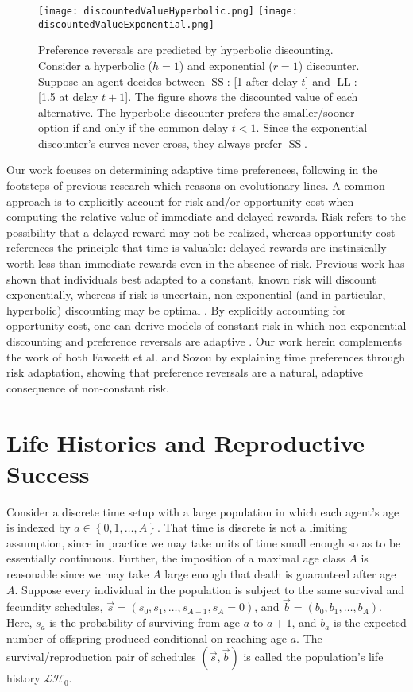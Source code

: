 \documentclass[titlepage, hidelinks, 12pt]{article}
\theoremstyle{plain}
\theoremstyle{remark}
\theoremstyle{definition}
\newcommand{\LH}{\mathcal{LH}}
\DeclareMathOperator{\smallersooner}{SS}
\DeclareMathOperator{\largerlater}{LL}
\begin{document}
\begin{figure}[H]
    \centering
    \texttt{[image: discountedValueHyperbolic.png]}
    \texttt{[image: discountedValueExponential.png]}
    \caption[Graphical depiction of a preference reversal.]{Preference reversals are predicted by hyperbolic discounting. Consider a hyperbolic ($h = 1$) and exponential ($r = 1$) discounter. 
       Suppose an agent
    decides between $\smallersooner$: [1 after delay $t$] and $\largerlater$: [1.5 at delay $t+1$]. The figure shows the discounted value
    of each alternative. The hyperbolic discounter prefers the smaller/sooner option if and only if the common delay $t < 1$. 
    Since the exponential discounter's curves never cross, they always prefer $\smallersooner$. }
\end{figure}

Our work focuses on determining adaptive time preferences, following in the footsteps of previous research which reasons on evolutionary
lines. A common approach is to explicitly account for risk and/or opportunity cost when computing the relative value of immediate and delayed
rewards. Risk refers to the possibility that a delayed reward may not be realized, whereas opportunity cost references the principle that
time is valuable: delayed rewards are instinsically worth less than immediate rewards even in the absence of risk. 
Previous work has shown that individuals best adapted
to a constant, known risk will discount exponentially, whereas if risk is uncertain, non-exponential (and in particular,
hyperbolic) discounting may be optimal \cite{sozou98}. By explicitly accounting for opportunity cost, one can derive models of constant
risk in which non-exponential discounting and preference reversals are adaptive \cite{fawcett12}.
Our work herein complements the work of both Fawcett et al. and Sozou by 
explaining time preferences through risk adaptation, showing that preference reversals
are a natural, adaptive consequence of non-constant risk. 

\section{Life Histories and Reproductive Success}

Consider a discrete time setup with a large population
in which each agent's age is indexed by $a\in\left\{ 0, 1, \ldots, A \right\}$. That time is discrete is
not a limiting assumption, since in practice we may take units of time small enough so as to be essentially continuous. Further, 
the imposition of a maximal age class $A$ is reasonable since we may take $A$ large enough that death is guaranteed after
age $A$. Suppose every individual in the population is subject to the same survival and fecundity
schedules, $\vec{s} = (s_0, s_1, \ldots, s_{A-1}, s_A = 0)$, and $\vec{b} = (b_0, b_1, \ldots, b_A)$. Here, 
$s_a$ is the probability of surviving from age $a$ to $a+1$, and $b_a$ is the expected
number of offspring produced conditional on reaching age $a$. 
The survival/reproduction pair of schedules $(\vec{s}, \vec{b})$
is called the population's life history $\LH_0$. 
\end{document}
